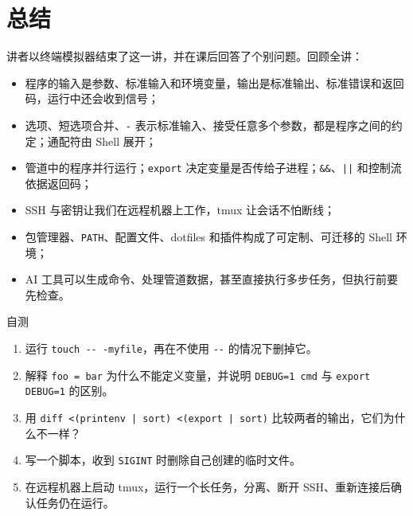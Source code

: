 \documentclass[a4paper]{article}
\begin{document}
\section{总结}

讲者以终端模拟器结束了这一讲，并在课后回答了个别问题。回顾全讲：
\begin{itemize}
\item 程序的输入是参数、标准输入和环境变量，输出是标准输出、标准错误和返回码，运行中还会收到信号；
\item 选项、短选项合并、\texttt{-} 表示标准输入、接受任意多个参数，都是程序之间的约定；通配符由 Shell 展开；
\item 管道中的程序并行运行；\texttt{export} 决定变量是否传给子进程；\texttt{\&\&}、\texttt{||} 和控制流依据返回码；
\item SSH 与密钥让我们在远程机器上工作，tmux 让会话不怕断线；
\item 包管理器、\texttt{PATH}、配置文件、dotfiles 和插件构成了可定制、可迁移的 Shell 环境；
\item AI 工具可以生成命令、处理管道数据，甚至直接执行多步任务，但执行前要先检查。
\end{itemize}

\begin{practicebox}{自测}
\begin{enumerate}
\item 运行 \texttt{touch -{}- -myfile}，再在不使用 \texttt{-{}-} 的情况下删掉它。
\item 解释 \texttt{foo = bar} 为什么不能定义变量，并说明 \texttt{DEBUG=1 cmd} 与 \texttt{export DEBUG=1} 的区别。
\item 用 \texttt{diff <(printenv | sort) <(export | sort)} 比较两者的输出，它们为什么不一样？
\item 写一个脚本，收到 \texttt{SIGINT} 时删除自己创建的临时文件。
\item 在远程机器上启动 tmux，运行一个长任务，分离、断开 SSH、重新连接后确认任务仍在运行。
\end{enumerate}
\end{practicebox}
\end{document}
